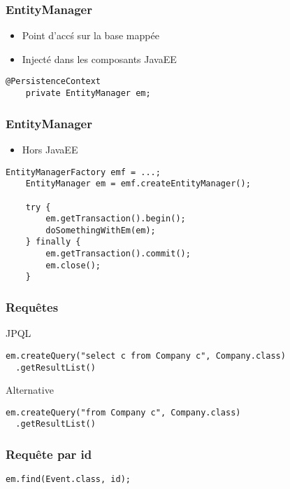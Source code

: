 \documentclass[t,12pt]{beamer}
\begin{document}
\begin{frame}[fragile]
	\frametitle{EntityManager}

	\begin{itemize}
		\item Point d'acc\'s sur la base mapp\'ee
		\item Inject\'e dans les composants JavaEE
	\end{itemize}

	\begin{lstlisting}[frame=none]
    @PersistenceContext
    private EntityManager em;
	\end{lstlisting}
\end{frame}

\begin{frame}[fragile]
	\frametitle{EntityManager}

	\begin{itemize}
		\item Hors JavaEE
	\end{itemize}

	\begin{lstlisting}[frame=none]
    EntityManagerFactory emf = ...;
    EntityManager em = emf.createEntityManager();

    try {
        em.getTransaction().begin();
        doSomethingWithEm(em);
    } finally {
        em.getTransaction().commit();
        em.close();
    }
	\end{lstlisting}
\end{frame}

\begin{frame}[fragile]
	\frametitle{Requ\^etes}

	\begin{block}{JPQL}
		\begin{lstlisting}[frame=none]
em.createQuery("select c from Company c", Company.class)
  .getResultList()
		\end{lstlisting}
	\end{block}

	\begin{exampleblock}{Alternative}
		\begin{lstlisting}[frame=none]
em.createQuery("from Company c", Company.class)
  .getResultList()
		\end{lstlisting}
	\end{exampleblock}
\end{frame}

\begin{frame}[fragile]
	\frametitle{Requ\^ete par id}

	\begin{lstlisting}[frame=none]
    em.find(Event.class, id);
	\end{lstlisting}
\end{frame}
\end{document}

